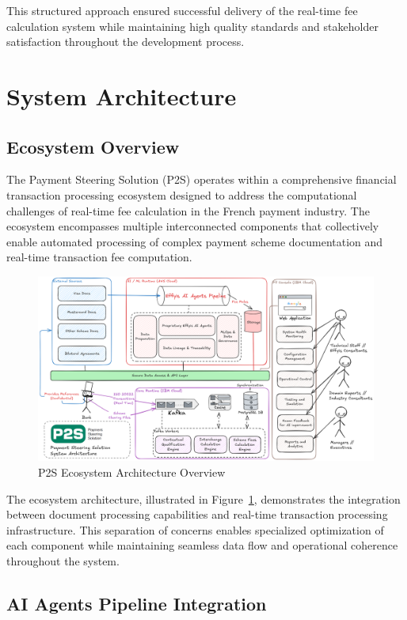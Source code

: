 This structured approach ensured successful delivery of the real-time fee calculation system while maintaining high quality standards and stakeholder satisfaction throughout the development process.

\section{System Architecture}

\subsection{Ecosystem Overview}

The Payment Steering Solution (P2S) operates within a comprehensive financial transaction processing ecosystem designed to address the computational challenges of real-time fee calculation in the French payment industry. The ecosystem encompasses multiple interconnected components that collectively enable automated processing of complex payment scheme documentation and real-time transaction fee computation.

\begin{figure}[H]
    \centering
    \includegraphics[width=\textwidth]{img/arch/new_archi.png}
    \caption{P2S Ecosystem Architecture Overview}
    \label{fig:solution_architecture}
\end{figure}

The ecosystem architecture, illustrated in Figure~\ref{fig:solution_architecture}, demonstrates the integration between document processing capabilities and real-time transaction processing infrastructure. This separation of concerns enables specialized optimization of each component while maintaining seamless data flow and operational coherence throughout the system.

\subsection{AI Agents Pipeline Integration}

